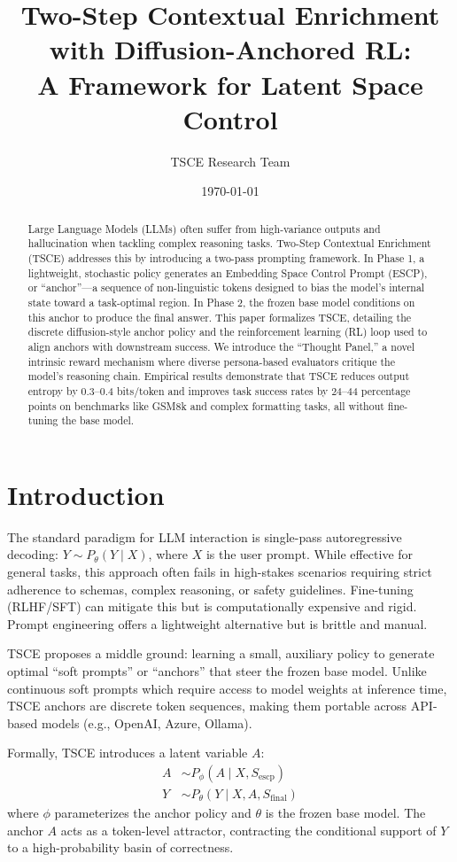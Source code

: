 \documentclass[11pt]{article}
\title{Two-Step Contextual Enrichment with Diffusion-Anchored RL: \\ A Framework for Latent Space Control}
\author{TSCE Research Team}
\date{\today}
\begin{document}
\maketitle

\begin{abstract}
Large Language Models (LLMs) often suffer from high-variance outputs and hallucination when tackling complex reasoning tasks. Two-Step Contextual Enrichment (TSCE) addresses this by introducing a two-pass prompting framework. In Phase 1, a lightweight, stochastic policy generates an Embedding Space Control Prompt (ESCP), or ``anchor''---a sequence of non-linguistic tokens designed to bias the model's internal state toward a task-optimal region. In Phase 2, the frozen base model conditions on this anchor to produce the final answer. This paper formalizes TSCE, detailing the discrete diffusion-style anchor policy and the reinforcement learning (RL) loop used to align anchors with downstream success. We introduce the ``Thought Panel,'' a novel intrinsic reward mechanism where diverse persona-based evaluators critique the model's reasoning chain. Empirical results demonstrate that TSCE reduces output entropy by 0.3--0.4 bits/token and improves task success rates by 24--44 percentage points on benchmarks like GSM8k and complex formatting tasks, all without fine-tuning the base model.
\end{abstract}

\section{Introduction}
The standard paradigm for LLM interaction is single-pass autoregressive decoding: $Y \sim P_{\theta}(Y \mid X)$, where $X$ is the user prompt. While effective for general tasks, this approach often fails in high-stakes scenarios requiring strict adherence to schemas, complex reasoning, or safety guidelines. Fine-tuning (RLHF/SFT) can mitigate this but is computationally expensive and rigid. Prompt engineering offers a lightweight alternative but is brittle and manual.

TSCE proposes a middle ground: learning a small, auxiliary policy to generate optimal ``soft prompts'' or ``anchors'' that steer the frozen base model. Unlike continuous soft prompts which require access to model weights at inference time, TSCE anchors are discrete token sequences, making them portable across API-based models (e.g., OpenAI, Azure, Ollama).

Formally, TSCE introduces a latent variable $A$:
\begin{align}
    A &\sim P_{\phi}(A \mid X, S_{\text{escp}}) \\
    Y &\sim P_{\theta}(Y \mid X, A, S_{\text{final}})
\end{align}
where $\phi$ parameterizes the anchor policy and $\theta$ is the frozen base model. The anchor $A$ acts as a token-level attractor, contracting the conditional support of $Y$ to a high-probability basin of correctness.
\end{document}
